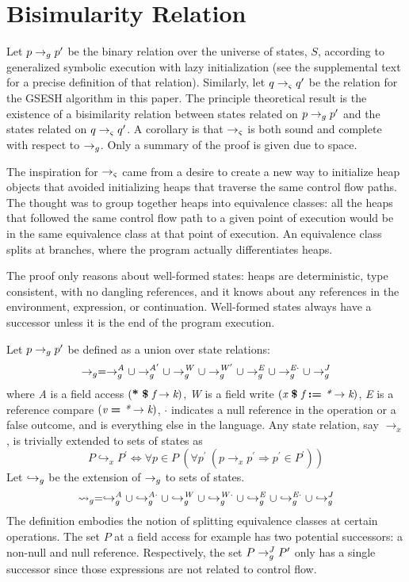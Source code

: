 \section{Bisimularity Relation}
Let $p \rightarrow_{g} p^\prime$ be the binary relation over the universe of states, $S$,
according to generalized symbolic execution with lazy initialization
(see the supplemental text for a precise definition of that
relation). Similarly, let $q \rightarrow_{\varsigma} q^\prime$ be the relation for the GSESH
algorithm in this paper. The principle theoretical result is the
existence of a bisimilarity relation between states related on $p \rightarrow_{g} p^\prime$
and the states related on $q \rightarrow_{\varsigma} q^\prime$. A corollary is that $\rightarrow_{\varsigma}$ is
both sound and complete with respect to $\rightarrow_{g}$. Only a summary of the
proof is given due to space.

The inspiration for $\rightarrow_{\varsigma}$ came from a desire to create
a new way to initialize heap objects that avoided initializing heaps
that traverse the same control flow paths. The thought was to group together heaps
into equivalence classes: all the heaps that followed the same control
flow path to a given point of execution would be in the same
equivalence class at that point of execution. An equivalence class
splits at branches, where the program actually differentiates heaps.

The proof only reasons about well-formed states: heaps are
deterministic, type consistent, with no dangling references, and it
knows about any references in the environment, expression, or
continuation. Well-formed states always have a successor unless it is
the end of the program execution.

Let $p \rightarrow_{g} p^\prime$ be defined as a union over state relations:
$$
\rightarrow_{g} = \rightarrow_{g}^\mathit{A} \cup  \rightarrow_{g}^\mathit{A^\prime} \cup \rightarrow_{g}^\mathit{W} \cup \rightarrow_{g}^\mathit{W^\prime} \cup \rightarrow_{g}^\mathit{E} \cup \rightarrow_{g}^\mathit{E\cdot} \cup \rightarrow_{g}^{J}
$$
where \emph{A} is a field access $\lp \cfgt{*}\ \cfgt{\$}\ \cfgnt{f}
\rightarrow \cfgnt{k}\rp$, \emph{W} is a field write $(
\emph{x}\ \textbf{\$}\ \emph{f}\ \textbf{:=}\ \emph{*} \rightarrow
\emph{k})$, \emph{E} is a reference compare $(
\emph{v}\ \textbf{=}\ \emph{*} \rightarrow \emph{k})$, $\cdot$
indicates a null reference in the operation or a false outcome, and
\emph{\com} is everything else in the language. Any state relation, say $\rightarrow_x$, is trivially extended to sets of states as
$$
P \hookrightarrow_x P^\prime \Longleftrightarrow \forall p \in P\ (\forall p^\prime\ (p \rightarrow_x p^\prime \Rightarrow p^\prime \in P^\prime))
$$
Let $\hookrightarrow_{g}$ be the extension of $\rightarrow_{g}$ to sets of states.
$$
\leadsto_{g} = \hookrightarrow_{g}^\mathit{A}
\cup \hookrightarrow_{g}^\mathit{A\cdot} \cup \hookrightarrow_{g}^\mathit{W} \cup
\hookrightarrow_{g}^\mathit{W\cdot} \cup \hookrightarrow_{g}^\mathit{E} \cup \hookrightarrow_{g}^\mathit{E\cdot}
\cup \hookrightarrow_{g}^{J}
$$
The definition embodies the notion of splitting equivalence classes at
certain operations. The set $P$ at a field access for example has two
potential successors: a non-null and null reference. Respectively, the
set $P \rightarrow_{g}^{J} P^\prime$ only has a single successor since those expressions
are not related to control flow.

